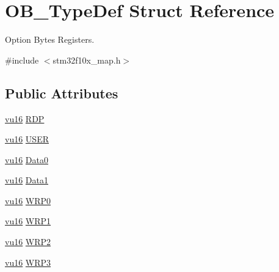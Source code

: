 \hypertarget{struct_o_b___type_def}{}\section{O\+B\+\_\+\+Type\+Def Struct Reference}
\label{struct_o_b___type_def}


Option Bytes Registers.  




{\ttfamily \#include $<$stm32f10x\+\_\+map.\+h$>$}

\subsection*{Public Attributes}
\begin{DoxyCompactItemize}
\item 
\hyperlink{agilefox_2library_2inc_2stm32f10x__type_8h_a9e9f2c67df0bbcd2dd7753693525ee07}{vu16} \hyperlink{struct_o_b___type_def_abdf1c3c20dff30e5583c1aeecc598b2e}{R\+DP}
\item 
\hyperlink{agilefox_2library_2inc_2stm32f10x__type_8h_a9e9f2c67df0bbcd2dd7753693525ee07}{vu16} \hyperlink{struct_o_b___type_def_afdfc00ac036ace8643ce3305da811a39}{U\+S\+ER}
\item 
\hyperlink{agilefox_2library_2inc_2stm32f10x__type_8h_a9e9f2c67df0bbcd2dd7753693525ee07}{vu16} \hyperlink{struct_o_b___type_def_ab445cde85671bb0d3a417dbd4f144fad}{Data0}
\item 
\hyperlink{agilefox_2library_2inc_2stm32f10x__type_8h_a9e9f2c67df0bbcd2dd7753693525ee07}{vu16} \hyperlink{struct_o_b___type_def_afcf3631c9eca46a2dc782dc9c51954fd}{Data1}
\item 
\hyperlink{agilefox_2library_2inc_2stm32f10x__type_8h_a9e9f2c67df0bbcd2dd7753693525ee07}{vu16} \hyperlink{struct_o_b___type_def_a81296f71933dfb95366cdf72426ac967}{W\+R\+P0}
\item 
\hyperlink{agilefox_2library_2inc_2stm32f10x__type_8h_a9e9f2c67df0bbcd2dd7753693525ee07}{vu16} \hyperlink{struct_o_b___type_def_a5765cd27fa38cda630a7cb0e91de14fa}{W\+R\+P1}
\item 
\hyperlink{agilefox_2library_2inc_2stm32f10x__type_8h_a9e9f2c67df0bbcd2dd7753693525ee07}{vu16} \hyperlink{struct_o_b___type_def_ae4323b7c39aa9415cf6f419d97368fb3}{W\+R\+P2}
\item 
\hyperlink{agilefox_2library_2inc_2stm32f10x__type_8h_a9e9f2c67df0bbcd2dd7753693525ee07}{vu16} \hyperlink{struct_o_b___type_def_aaab1725e4b82d905feaa6e150e391cf8}{W\+R\+P3}
\item 

\end{DoxyCompactItemize}
